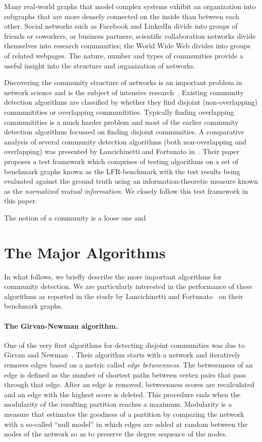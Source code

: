 Many real-world graphs that model complex systems exhibit an organization 
into subgraphs that are more densely connected on the inside than between each other. 
Social networks such as Facebook and LinkedIn divide into groups of friends 
or coworkers, or business partners; scientific collaboration networks divide 
themselves into research communities; the World Wide Web divides into groups 
of related webpages. The nature, number and types of communities provide 
a useful insight into the structure and organization of networks. 

Discovering the community structure of networks is an 
important problem in network science and is the subject 
of intensive research~\cite{GN02, GN04, CNM04, RCC04, DM04, PDFV05, NL07, 
BGLL08, RB08, RN09}. Existing community detection algorithms are 
classified by whether they find disjoint (non-overlapping) 
communitities or overlapping communitities. Typically finding 
overlapping communitities is a much harder problem and most of the 
earlier community detection algorithms focussed on finding disjoint 
communities. A comparative analysis of several community detection algorithms 
(both non-overlapping and overlapping) was presented by Lancichinetti and Fortunato 
in~\cite{LF09}. Their paper proposes a test framework 
which comprises of testing algorithms on a set of benchmark graphs 
known as the LFR-benchmark with the test results being evaluated against 
the ground truth using an information-theoretic measure known as the \emph{normalized 
mutual information}. We closely follow this test framework in this paper. 


The notion of a community is a loose one and 

\section{The Major Algorithms}
In what follows, we briefly describe the more important algorithms 
for community detection. We are particularly interested in the performance 
of these algorithms as reported in the study by Lancichinetti and 
Fortunato~\cite{LF09} on their benchmark graphs. 

\paragraph{The Girvan-Newman algorithm.} 
One of the very first algorithms for detecting disjoint communities 
was due to Girvan and Newman~\cite{GN02, GN04}. Their 
algorithm starts with a network and iteratively removes edges based 
on a metric called \emph{edge betweenness}. The betweenness of an 
edge is defined as the number of shortest paths between vertex pairs 
that pass through that edge. After an edge is removed, betweenness 
scores are recalculated and an edge with the highest score is deleted. 
This procedure ends when the modularity of the resulting partition
reaches a maximum. Modularity is a measure that estimates the goodness 
of a partition by comparing the network with a so-called ``null model''
in which edges are added at random between the nodes of the network 
so as to preserve the degree sequence of the nodes. 

